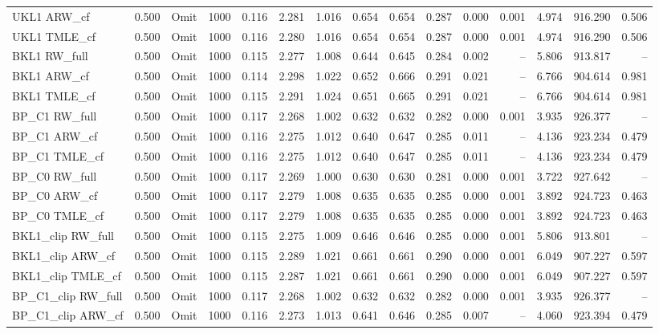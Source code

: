 \begin{tabular}{llllrrrrrrrrrrr}
UKL1 ARW\_cf & 0.500 & Omit & 1000 & 0.116 & 2.281 & 1.016 & 0.654 & 0.654 & 0.287 & 0.000 & 0.001 & 4.974 & 916.290 & 0.506 \\
UKL1 TMLE\_cf & 0.500 & Omit & 1000 & 0.116 & 2.280 & 1.016 & 0.654 & 0.654 & 0.287 & 0.000 & 0.001 & 4.974 & 916.290 & 0.506 \\
BKL1 RW\_full & 0.500 & Omit & 1000 & 0.115 & 2.277 & 1.008 & 0.644 & 0.645 & 0.284 & 0.002 & -- & 5.806 & 913.817 & -- \\
BKL1 ARW\_cf & 0.500 & Omit & 1000 & 0.114 & 2.298 & 1.022 & 0.652 & 0.666 & 0.291 & 0.021 & -- & 6.766 & 904.614 & 0.981 \\
BKL1 TMLE\_cf & 0.500 & Omit & 1000 & 0.115 & 2.291 & 1.024 & 0.651 & 0.665 & 0.291 & 0.021 & -- & 6.766 & 904.614 & 0.981 \\
BP\_C1 RW\_full & 0.500 & Omit & 1000 & 0.117 & 2.268 & 1.002 & 0.632 & 0.632 & 0.282 & 0.000 & 0.001 & 3.935 & 926.377 & -- \\
BP\_C1 ARW\_cf & 0.500 & Omit & 1000 & 0.116 & 2.275 & 1.012 & 0.640 & 0.647 & 0.285 & 0.011 & -- & 4.136 & 923.234 & 0.479 \\
BP\_C1 TMLE\_cf & 0.500 & Omit & 1000 & 0.116 & 2.275 & 1.012 & 0.640 & 0.647 & 0.285 & 0.011 & -- & 4.136 & 923.234 & 0.479 \\
BP\_C0 RW\_full & 0.500 & Omit & 1000 & 0.117 & 2.269 & 1.000 & 0.630 & 0.630 & 0.281 & 0.000 & 0.001 & 3.722 & 927.642 & -- \\
BP\_C0 ARW\_cf & 0.500 & Omit & 1000 & 0.117 & 2.279 & 1.008 & 0.635 & 0.635 & 0.285 & 0.000 & 0.001 & 3.892 & 924.723 & 0.463 \\
BP\_C0 TMLE\_cf & 0.500 & Omit & 1000 & 0.117 & 2.279 & 1.008 & 0.635 & 0.635 & 0.285 & 0.000 & 0.001 & 3.892 & 924.723 & 0.463 \\
BKL1\_clip RW\_full & 0.500 & Omit & 1000 & 0.115 & 2.275 & 1.009 & 0.646 & 0.646 & 0.285 & 0.000 & 0.001 & 5.806 & 913.801 & -- \\
BKL1\_clip ARW\_cf & 0.500 & Omit & 1000 & 0.115 & 2.289 & 1.021 & 0.661 & 0.661 & 0.290 & 0.000 & 0.001 & 6.049 & 907.227 & 0.597 \\
BKL1\_clip TMLE\_cf & 0.500 & Omit & 1000 & 0.115 & 2.287 & 1.021 & 0.661 & 0.661 & 0.290 & 0.000 & 0.001 & 6.049 & 907.227 & 0.597 \\
BP\_C1\_clip RW\_full & 0.500 & Omit & 1000 & 0.117 & 2.268 & 1.002 & 0.632 & 0.632 & 0.282 & 0.000 & 0.001 & 3.935 & 926.377 & -- \\
BP\_C1\_clip ARW\_cf & 0.500 & Omit & 1000 & 0.116 & 2.273 & 1.013 & 0.641 & 0.646 & 0.285 & 0.007 & -- & 4.060 & 923.394 & 0.479 \\

\end{tabular}
